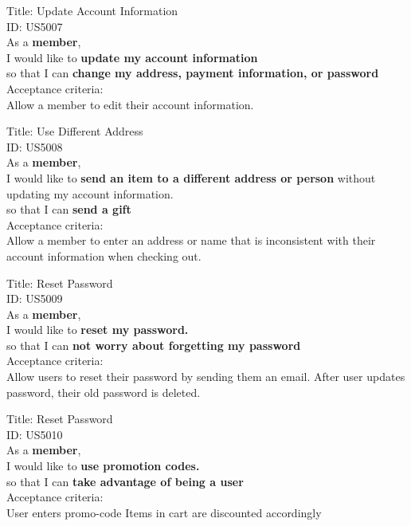 \documentclass{article}
\begin{document}
\begin{framed}
\noindent
Title:  Update Account Information \\
ID: US5007 \\
As a \textbf{member},\\
\textbullet  \quad \quad I would like to \textbf{update my account information}\\ 
\textbullet  \quad \quad so that I can \textbf{change my address, payment information, or password}\\
Acceptance criteria: \\
\textbullet  \quad \quad Allow a member to edit their account information.
\end{framed}


\begin{framed}
\noindent
Title:  Use Different Address \\
ID: US5008 \\
As a \textbf{member},\\
\textbullet  \quad \quad I would like to \textbf{send an item to a different address or person} without updating my account information.\\
\textbullet  \quad \quad so that I can \textbf{send a gift}\\
Acceptance criteria: \\
\textbullet  \quad \quad Allow a member to enter an address or name that is inconsistent with their account information when checking out.
\end{framed}

\begin{framed}
\noindent
Title:  Reset Password \\
ID: US5009 \\
As a \textbf{member},\\
\textbullet  \quad \quad I would like to \textbf{reset my password.}\\
\textbullet  \quad \quad so that I can \textbf{not worry about forgetting my password}\\
Acceptance criteria: \\
\textbullet  \quad \quad Allow users to reset their password by sending them an email.
\textbullet  \quad \quad After user updates password, their old password is deleted.
\end{framed}

\begin{framed}
\noindent
Title:  Reset Password \\
ID: US5010 \\
As a \textbf{member},\\
\textbullet  \quad \quad I would like to \textbf{use promotion codes.}\\
\textbullet  \quad \quad so that I can \textbf{take advantage of being a user}\\
Acceptance criteria: \\
\textbullet  \quad \quad User enters promo-code
\textbullet  \quad \quad Items in cart are discounted accordingly
\end{framed}
\end{document}
